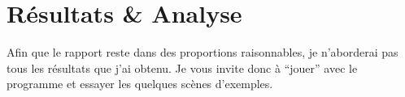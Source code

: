 \chapter{Résultats \& Analyse}
Afin que le rapport reste dans des proportions raisonnables, je n'aborderai
pas tous les résultats que j'ai obtenu. Je vous invite donc à ``jouer'' avec
le programme et essayer les quelques scènes d'exemples.

\clearpage

\clearpage

\clearpage

\clearpage

\clearpage

\clearpage

\clearpage

\clearpage

\clearpage

% 

